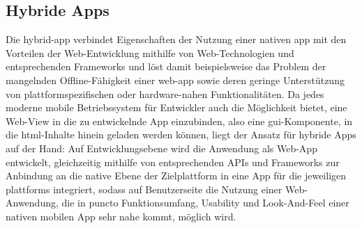 \subsection{Hybride Apps} \label{sec:hybrid-app}

Die \gls{hybrid-app} verbindet Eigenschaften der Nutzung einer nativen \gls{app} mit den Vorteilen der Web-Entwicklung mithilfe von Web-Technologien und entsprechenden Frameworks und löst damit beispielsweise das Problem der mangelnden Offline-Fähigkeit einer \gls{web-app} sowie deren geringe Unterstützung von plattformspezifischen oder hardware-nahen Funktionalitäten. 
Da jedes moderne mobile Betriebssystem für Entwickler auch die Möglichkeit bietet, eine Web-View in die zu entwickelnde App einzubinden, also eine \gls{gui}-Komponente, in die \gls{html}-Inhalte hinein geladen werden können, liegt der Ansatz für hybride Apps auf der Hand: Auf Entwicklungsebene wird die Anwendung als Web-App entwickelt, gleichzeitig mithilfe von entsprechenden APIs und Frameworks zur Anbindung an die native Ebene der Zielplattform in eine App für die jeweiligen \glspl{plattform} integriert, sodass auf Benutzerseite die Nutzung einer Web-Anwendung, die in puncto Funktionsumfang, Usability und Look-And-Feel einer nativen mobilen App sehr nahe kommt, möglich wird.

